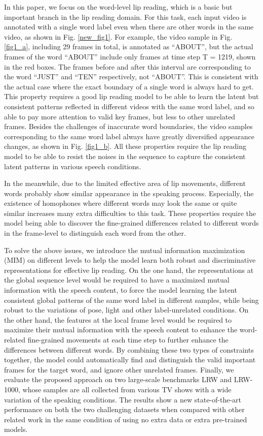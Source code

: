 \documentclass[a4paper, 10pt, conference]{ieeeconf}      \usepackage{FG2020}
\begin{document}
In this paper, we focus on the word-level lip reading, which is a basic but important branch in the lip reading domain. For this task, each input video is annotated with a single word label even when there are other words in the same video, as shown in Fig. \ref{new_fig1}. For example, the video sample in Fig. \ref{fig1_a}, including 29 frames in total, is annotated as ``ABOUT'', but the actual frames of the word ``ABOUT'' include only frames at time step T = 1219, shown in the red boxes. The frames before and after this interval are corresponding to the word ``JUST'' and ``TEN'' respectively, not ``ABOUT''. This is consistent with the actual case where the exact boundary of a single word is always hard to get. This property requires a good lip reading model to be able to learn the latent but consistent patterns reflected in different videos with the same word label, and so able to pay more attention to valid key frames, but less to other unrelated frames. Besides the challenges of inaccurate word boundaries, the video samples corresponding to the same word label always have greatly diversified appearance changes, as shown in Fig. \ref{fig1_b}. All these properties require the lip reading model to be able to resist the noises in the sequence to capture the consistent latent patterns in various speech conditions.

In the meanwhile, due to the limited effective area of lip movements, different words probably show similar appearance in the speaking process. Especially, the existence of homophones where different words may look the same or quite similar increases many extra difficulties to this task. These properties require the model being able to discover the fine-grained differences related to different words in the frame-level to distinguish each word from the other.

To solve the above issues, we introduce the mutual information maximization (MIM) on different levels to help the model learn both robust and discriminative representations for effective lip reading. On the one hand, the representations at the global sequence level would be required to have a maximized mutual information with the speech content, to force the model learning the latent consistent global patterns of the same word label in different samples, while being robust to the variations of pose, light and other label-unrelated conditions. On the other hand, the features at the local frame level would be required to maximize their mutual information with the speech content to enhance the word-related fine-grained movements at each time step to further enhance the differences between different words. By combining these two types of constraints together, the model could automatically find and distinguish the valid important frames for the target word, and ignore other unrelated frames. Finally, we evaluate the proposed approach on two large-scale benchmarks LRW and LRW-1000, whose samples are all collected from various TV shows with a wide variation of the speaking conditions. The results show a new state-of-the-art performance on both the two challenging datasets when compared with other related work in the same condition of using no extra data or extra pre-trained models. 
\end{document}
